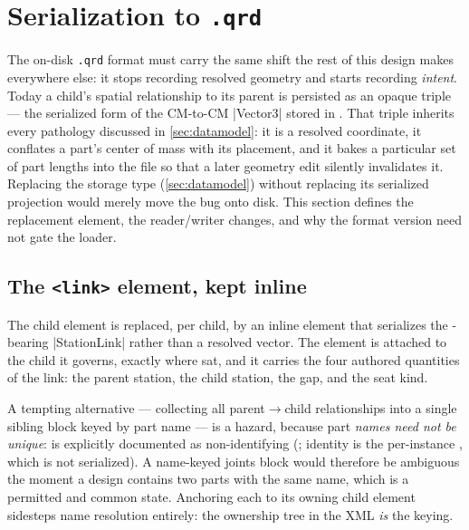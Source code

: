 \section{Serialization to \texttt{.qrd}}\label{sec:serialization}

The on-disk \texttt{.qrd} format must carry the same shift the rest of this design
makes everywhere else: it stops recording resolved geometry and starts recording
\emph{intent}. Today a child's spatial relationship to its parent is persisted as an
opaque  triple --- the serialized form of the CM-to-CM
\cppinline|Vector3| stored in . That triple inherits every pathology
discussed in \cref{sec:datamodel}: it is a resolved coordinate, it conflates a part's center
of mass with its placement, and it bakes a particular set of part lengths
into the file so that a later geometry edit silently invalidates it. Replacing the
storage type (\cref{sec:datamodel}) without replacing its serialized projection would
merely move the bug onto disk. This section defines the replacement element, the
reader/writer changes, and why the format version need not gate the loader.

\subsection{The \texttt{<link>} element, kept inline}

The  child element is replaced, per child, by an inline 
element that serializes the \seat{}-bearing \cppinline|StationLink| rather than a
resolved vector. The element is attached to the child  it governs, exactly
where  sat, and it carries the four authored quantities of the link:
the parent station, the child station, the gap, and the seat kind.

\begin{designrule}
A tempting alternative --- collecting all parent$\rightarrow$child relationships into a
single sibling  block keyed by part name --- is a hazard, because part
\emph{names need not be unique}:  is explicitly documented as
non-identifying (; identity is the per-instance
, which is not serialized). A name-keyed joints block would therefore be
ambiguous the moment a design contains two parts with the same name, which is a
permitted and common state. Anchoring each  to its owning child element
sidesteps name resolution entirely: the ownership tree in the XML \emph{is} the keying.
\end{designrule}

